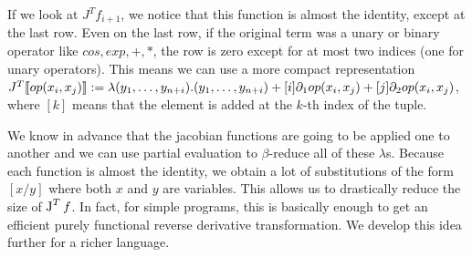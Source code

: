 If we look at $J^Tf_{i+1}$, we notice that this function is almost the identity, except at the last row. 
Even on the last row, if the original term was a unary or binary operator like $cos, exp, +, *$, 
the row is zero except for at most two indices (one for unary operators).
This means we can use a more compact representation $J^T\llbracket op(x_i,x_j)\rrbracket:=\lambda (y_1,\ldots,y_{n+i}).(y_1,\ldots,y_{n+i})+[i]\partial_1op(x_i,x_j)+[j]\partial_2op(x_i,x_j)$, 
where $[k]$ means that the element is added at the $k$-th index of the tuple.

We know in advance that the jacobian functions are going to be applied one to another and we can use partial evaluation to $\beta$-reduce all of these $\lambda$s.
Because each function is almost the identity, we obtain a lot of substitutions of the form $[x/y]$ where both $x$ and $y$ are variables. 
This allows us to drastically reduce the size of $\operatorname{J}^Tf$. In fact, for simple programs, this is basically enough to get an efficient purely functional reverse derivative transformation.
We develop this idea further for a richer language.

\pagebreak